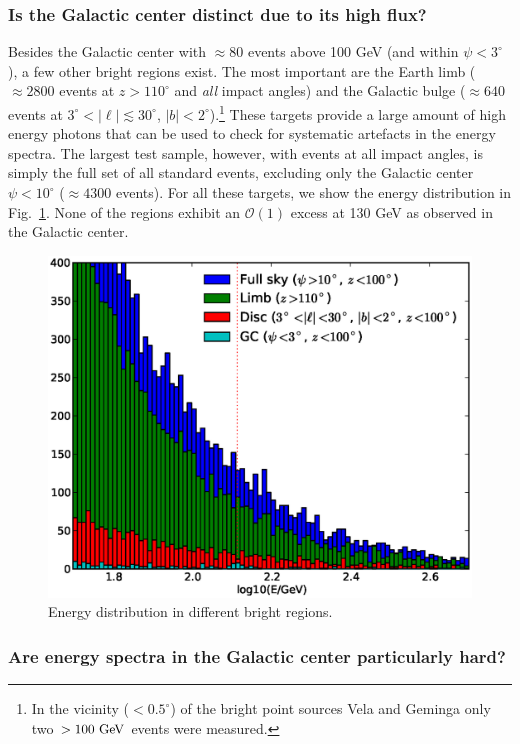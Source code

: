 \documentclass[aps,twocolumn,prd,superscriptaddress,showpacs,nofootinbib,fixfloat]{revtex4}
\newcommand{\GeV}{{\rm ~GeV}}
\begin{document}
\subsubsection{Is the Galactic center distinct due to its high flux?} 
Besides the Galactic center with $\approx80$ events above 100 GeV (and within
$\psi<3^\circ$), a few other bright regions exist.  The most important are the
Earth limb ($\approx2800$ events at $z>110^\circ$ and \emph{all} impact
angles) and the Galactic bulge ($\approx640$ events at
$3^\circ<|\ell|\lesssim30^\circ$, $|b|<2^\circ$).\footnote{In the vicinity
($<0.5^\circ$) of the bright point sources Vela and Geminga only two
$>100\GeV$ events were measured.} These targets provide a large amount of high
energy photons that can be used to check for systematic artefacts in the
energy spectra. The largest test sample, however, with events at all impact
angles, is simply the full set of all standard events, excluding only the
Galactic center $\psi<10^\circ$ ($\approx 4300$ events). For all these
targets, we show the energy distribution in Fig.~\ref{fig:target_spectra}.
None of the regions exhibit an $\mathcal{O}(1)$ excess at 130 GeV as observed
in the Galactic center.

\begin{figure}
\centering
\includegraphics[width=1.0\linewidth]{plots/target_spectra.eps}
\caption{Energy distribution in different bright regions.}
\label{fig:target_spectra}
\end{figure}

\subsubsection{Are energy spectra in the Galactic center particularly hard?}
\end{document}
